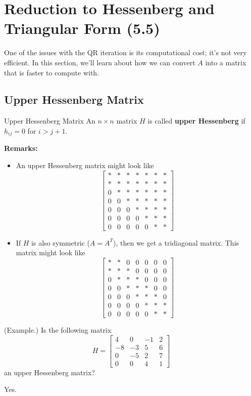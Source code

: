 \documentclass[letterpaper]{article}
\newcommand{\0}{\mathbf{0}}
\begin{document}
\section{Reduction to Hessenberg and Triangular Form (5.5)}
One of the issues with the QR iteration is its computational cost; it's not very efficient. In this section, we'll learn about how we can convert $A$ into a matrix that is faster to compute with. 

\subsection{Upper Hessenberg Matrix}
\begin{definition}{Upper Hessenberg Matrix}{}
    An $n \times n$ matrix $H$ is called \textbf{upper Hessenberg} if $h_{ij} = 0$ for $i > j + 1$. 
\end{definition}
\textbf{Remarks:} 
\begin{itemize}
    \item An upper Hessenberg matrix might look like 
    \[\begin{bmatrix}
        * & * & * & * & * & * & * \\ 
        * & * & * & * & * & * & * \\
        0 & * & * & * & * & * & * \\
        0 & 0 & * & * & * & * & * \\ 
        0 & 0 & 0 & * & * & * & * \\ 
        0 & 0 & 0 & 0 & * & * & * \\ 
        0 & 0 & 0 & 0 & 0 & * & *
    \end{bmatrix}\]
    \item If $H$ is also symmetric ($A = A^T$), then we get a tridiagonal matrix. This matrix might look like 
    \[\begin{bmatrix}
        * & * & 0 & 0 & 0 & 0 & 0 \\ 
        * & * & * & 0 & 0 & 0 & 0 \\
        0 & * & * & * & 0 & 0 & 0 \\
        0 & 0 & * & * & * & 0 & 0 \\ 
        0 & 0 & 0 & * & * & * & 0 \\ 
        0 & 0 & 0 & 0 & * & * & * \\ 
        0 & 0 & 0 & 0 & 0 & * & *
    \end{bmatrix}\]
\end{itemize}

\begin{mdframed}
    (Example.) Is the following matrix 
    \[H = \begin{bmatrix}
        4 & 0 & -1 & 2 \\ 
        -8 & -3 & 5 & 6 \\ 
        0 & -5 & 2 & 7 \\ 
        0 & 0 & 4 & 1
    \end{bmatrix}\]
    an upper Hessenberg matrix? 

    \begin{mdframed}
        Yes. 
    \end{mdframed}
\end{mdframed}
\end{document}
